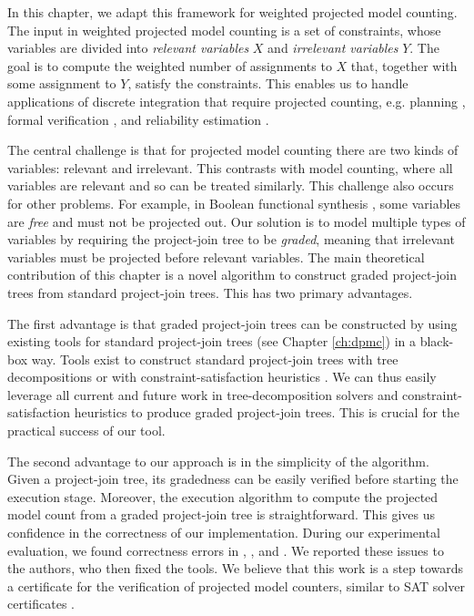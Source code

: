 In this chapter, we adapt this framework for weighted projected model counting. 
{ \color{blue} %
The input in weighted projected model counting is a set of constraints, whose variables are divided into \emph{relevant variables} $X$ and \emph{irrelevant variables} $Y$.
The goal is to compute the weighted number of assignments to $X$ that, together with some assignment to $Y$, satisfy the constraints.
This enables us to handle applications of discrete integration that require projected counting, e.g. planning \cite{aziz2015projected}, formal verification \cite{klebanov2013sat}, and reliability estimation \cite{duenas2017counting}. 
}

The central challenge is that for projected model counting there are two kinds of variables: relevant and irrelevant. This contrasts with model counting, where all variables are relevant and so can be treated similarly. This challenge also occurs for other problems.
For example, in Boolean functional synthesis \cite{tabajara2017factored}, some variables are \emph{free} and must not be projected out. 
Our solution is to model multiple types of variables by requiring the project-join tree to be \emph{graded}, meaning that irrelevant variables must be projected before relevant variables. The main theoretical contribution of this chapter is a novel algorithm to construct graded project-join trees from standard project-join trees. This has two primary advantages. 

The first advantage is that graded project-join trees can be constructed by using existing tools for standard project-join trees (see Chapter \ref{ch:dpmc}) in a black-box way. Tools exist to construct standard project-join trees with tree decompositions \cite{RS91} or with constraint-satisfaction heuristics \cite{tarjan1984simple,koster2001treewidth,dechter03,dechter99,bouquet1999gestion}.
We can thus easily leverage all current and future work in tree-decomposition solvers \cite{strasser2017computing,AMW17,Tamaki17} and constraint-satisfaction heuristics to produce graded project-join trees. This is crucial for the practical success of our tool.

The second advantage to our approach is in the simplicity of the algorithm. Given a project-join tree, its gradedness can be easily verified before starting the execution stage. 
Moreover, the execution algorithm to compute the projected model count from a graded project-join tree is straightforward. This gives us confidence in the correctness of our implementation.
During our experimental evaluation, we found correctness errors in \dfp{} \cite{lagniez2019recursive}, \projmc{} \cite{lagniez2019recursive}, and \ssat{} \cite{lee2017solving}.
We reported these issues to the authors, who then fixed the tools.
We believe that this work is a step towards a certificate for the verification of projected model counters, similar to SAT solver certificates \cite{wetzler2014drat}.

